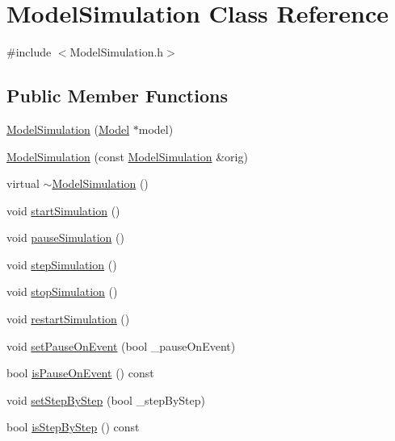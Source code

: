 \hypertarget{class_model_simulation}{\section{Model\-Simulation Class Reference}
\label{class_model_simulation}
}


{\ttfamily \#include $<$Model\-Simulation.\-h$>$}

\subsection*{Public Member Functions}
\begin{DoxyCompactItemize}
\item 
\hyperlink{class_model_simulation_a273434a2086791805d46aef9afadd24d}{Model\-Simulation} (\hyperlink{class_model}{Model} $\ast$model)
\item 
\hyperlink{class_model_simulation_a5858ba409b91834ee922985d1ccd8feb}{Model\-Simulation} (const \hyperlink{class_model_simulation}{Model\-Simulation} \&orig)
\item 
virtual \hyperlink{class_model_simulation_a9ca43a1faf5b4f3bc4f4934024e4d5f1}{$\sim$\-Model\-Simulation} ()
\item 
void \hyperlink{class_model_simulation_a22ea961f3242d4466dc0cf392c66d5e9}{start\-Simulation} ()
\item 
void \hyperlink{class_model_simulation_a6ceaa12581ed433b97452958dfd3371b}{pause\-Simulation} ()
\item 
void \hyperlink{class_model_simulation_a68e02df4b71756d360ca0e25464447be}{step\-Simulation} ()
\item 
void \hyperlink{class_model_simulation_a8ee10a8bee6b90b91aba1c5ee62f0f36}{stop\-Simulation} ()
\item 
void \hyperlink{class_model_simulation_a0fd9ccdaf26dbf79daedfece08d9f0ea}{restart\-Simulation} ()
\item 
void \hyperlink{class_model_simulation_a1af329d915189bd4f295d9d1439c0fd1}{set\-Pause\-On\-Event} (bool \-\_\-pause\-On\-Event)
\item 
bool \hyperlink{class_model_simulation_a8874f4dfce1800cdce2e9ee68193f1c2}{is\-Pause\-On\-Event} () const 
\item 
void \hyperlink{class_model_simulation_a20102be83bb5d73e0ba56896e7df8e4e}{set\-Step\-By\-Step} (bool \-\_\-step\-By\-Step)
\item 
bool \hyperlink{class_model_simulation_af50016a6b4a066cca6194c0c0a3349e7}{is\-Step\-By\-Step} () const 

\end{DoxyCompactItemize}
